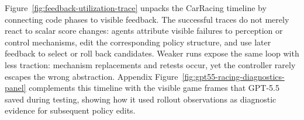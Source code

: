 


Figure~\ref{fig:feedback-utilization-trace} unpacks the CarRacing timeline by connecting code phases to visible feedback. The successful traces do not merely react to scalar score changes: agents attribute visible failures to perception or control mechanisms, edit the corresponding policy structure, and use later feedback to select or roll back candidates. Weaker runs expose the same loop with less traction: mechanism replacements and retests occur, yet the controller rarely escapes the wrong abstraction. Appendix Figure~\ref{fig:gpt55-racing-diagnostics-panel} complements this timeline with the visible game frames that GPT-5.5 saved during testing, showing how it used rollout observations as diagnostic evidence for subsequent policy edits.




